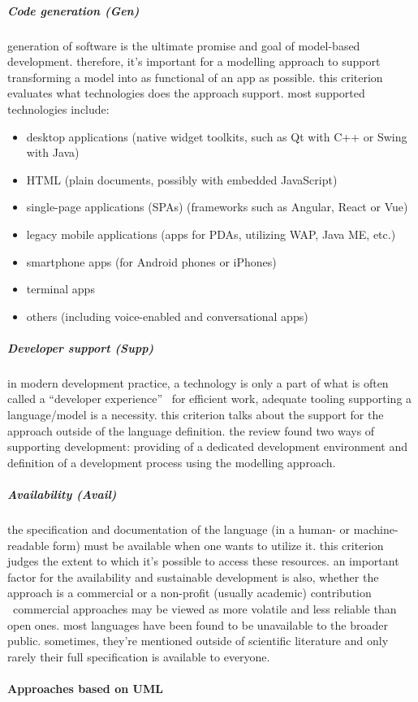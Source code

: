 \subparagraph{Code generation (Gen)}
generation of software is the ultimate promise and goal of model-based development.
therefore, it's important for a modelling approach to support transforming a model into as functional of an app as possible.
this criterion evaluates what technologies does the approach support.
most supported technologies include:
\begin{itemize}
    \item desktop applications (native widget toolkits, such as Qt with C++ or Swing with Java)
    \item HTML (plain documents, possibly with embedded JavaScript)
    \item single-page applications (SPAs) (frameworks such as Angular, React or Vue)
    \item legacy mobile applications (apps for PDAs, utilizing WAP, Java ME, etc.)
    \item smartphone apps (for Android phones or iPhones)
    \item terminal apps
    \item others (including voice-enabled and conversational apps)
\end{itemize}

\subparagraph{Developer support (Supp)}
in modern development practice, a technology is only a part of what is often called a \enquote{developer experience} \textemdash\ for efficient work, adequate tooling supporting a language/model is a necessity.
this criterion talks about the support for the approach outside of the language definition.
the review found two ways of supporting development: providing of a dedicated development environment and definition of a development process using the modelling approach.

\subparagraph{Availability (Avail)}
the specification and documentation of the language (in a human- or machine-readable form) must be available when one wants to utilize it.
this criterion judges the extent to which it's possible to access these resources.
an important factor for the availability and sustainable development is also, whether the approach is a commercial or a non-profit (usually academic) contribution \textemdash\ commercial approaches may be viewed as more volatile and less reliable than open ones.
most languages have been found to be unavailable to the broader public.
sometimes, they're mentioned outside of scientific literature and only rarely their full specification is available to everyone.

\paragraph{Approaches based on UML}

